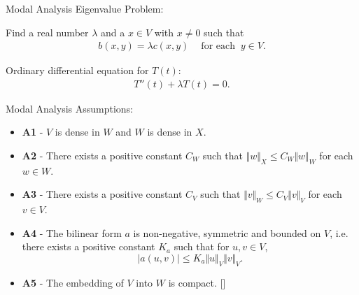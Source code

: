 \documentclass[8pt]{beamer}
\begin{document}
        \begin{frame}{Modal Analysis}
            Eigenvalue Problem:
        
            Find a real number $\lambda$ and a $x \in V$ with $x \neq 0$ such that
            \begin{eqnarray*}
                b(x,y) = \lambda c(x,y) \ \ \ \ \textrm{ for each } \ y \in V.
            \end{eqnarray*}

            Ordinary differential equation for $T(t)$:
            \begin{eqnarray}
                T''(t)  + \lambda T(t) = 0. \label{eq:1D_Model:ModalAnalysisODE}
            \end{eqnarray}
         \end{frame}
        
        \begin{frame}{Modal Analysis}
            Assumptions:
            \begin{itemize}
                \item[] \textbf{A1} - $V$ is dense in $W$ and $W$ is dense in $X$.
            
                \item[] \textbf{A2} - There exists a positive constant $C_{W}$ such that $\Vert w\Vert_{X} \leq C_{W}\Vert w\Vert_{W}$ for each $ w\in W$.
            
                \item[] \textbf{A3} - There exists a positive constant $C_{V}$ such that $\Vert v\Vert_{W} \leq C_{V}\Vert v\Vert_{V}$ for each $v \in V$.
            
                \item[] \textbf{A4} - The bilinear form $a$ is non-negative, symmetric and bounded on $V$, i.e. there exists a positive constant $K_a$ such that for $\displaystyle u,v \in V$, \[|a(u,v)| \leq K_a\Vert u \Vert_V \Vert v \Vert_V.\]
            
                \item[] \alert{\textbf{A5} - The embedding of $V$ into $W$ is compact.} [\cite{CVV18}]
            \end{itemize}
        \end{frame}
\end{document}
